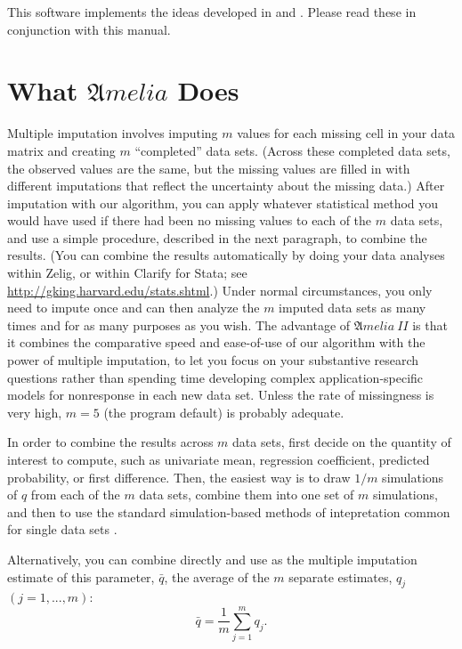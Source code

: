 \documentclass[12pt,titlepage]{article}
\newcommand{\AmeliaII}{\ensuremath{\mathfrak Amelia~II} }
\begin{document}
This software implements the ideas developed in \citet*{KinHonJos01}
and \citet*{HonKin06}.  Please read these in conjunction with this
manual.

\section{What ${\mathfrak Amelia}$ Does}
\label{sec:what}

Multiple imputation involves imputing $m$ values for each missing cell
in your data matrix and creating $m$ ``completed'' data sets.  (Across
these completed data sets, the observed values are the same, but the
missing values are filled in with different imputations that reflect
the uncertainty about the missing data.)  After imputation with our
algorithm, you can apply whatever statistical method you would have
used if there had been no missing values to each of the $m$ data sets,
and use a simple procedure, described in the next paragraph, to
combine the results.  (You can combine the results automatically by
doing your data analyses within Zelig, or within Clarify for Stata;
see \url{http://gking.harvard.edu/stats.shtml}.)  Under normal
circumstances, you only need to impute once and can then analyze the
$m$ imputed data sets as many times and for as many purposes as you
wish.  The advantage of \AmeliaII is that it combines the comparative
speed and ease-of-use of our algorithm with the power of multiple
imputation, to let you focus on your substantive research questions
rather than spending time developing complex application-specific
models for nonresponse in each new data set.  Unless the rate of
missingness is very high, $m = 5$ (the program default) is probably
adequate.

In order to combine the results across $m$ data sets, first decide on
the quantity of interest to compute, such as univariate mean,
regression coefficient, predicted probability, or first difference.
Then, the easiest way is to draw $1/m$ simulations of $q$ from each of
the $m$ data sets, combine them into one set of $m$ simulations, and
then to use the standard simulation-based methods of intepretation
common for single data sets \citep{KinTomWit00}.

Alternatively, you can combine directly and use as the multiple
imputation estimate of this parameter, $\bar{q}$, the average of the
$m$ separate estimates, $q_j$ $(j=1,...,m)$:
\begin{equation}
  \bar{q}=\frac{1}{m}\sum^{m}_{j=1}q_j.  
\end{equation}
\end{document}
